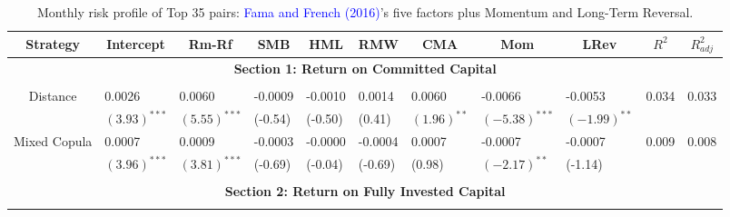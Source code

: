 \documentclass[a4paper]{article}
\begin{document}
		\begin{table}[!ht]
		\centering \scriptsize
		\caption{Monthly risk profile of Top 35 pairs: \textcolor{blue}{Fama and French} \textcolor{blue}{(2016)}'s five factors plus Momentum and Long-Term Reversal.}
		\begin{threeparttable}[H]
			\begin{tabularx}{\textwidth}{@{\extracolsep{\fill}} lllllllllll@{}}
				\toprule
				\multicolumn{1}{c}{Strategy} & \multicolumn{1}{c}{Intercept} &  \multicolumn{1}{c}{Rm-Rf} &  \multicolumn{1}{c}{SMB} &  \multicolumn{1}{c}{HML} &  \multicolumn{1}{c}{RMW} &  \multicolumn{1}{c}{CMA} & 
				\multicolumn{1}{c}{Mom} &  \multicolumn{1}{c}{LRev} &  \multicolumn{1}{c}{$R^{2}$} & \multicolumn{1}{c}{$R^{2}_{adj}$} \\
				\midrule
				\multicolumn{11}{c}{\textbf{Section 1: Return on Committed Capital}} \\
				\multicolumn{1}{c}{} & \multicolumn{1}{c}{} & \multicolumn{1}{c}{} & \multicolumn{1}{c}{} & \multicolumn{1}{c}{} & \multicolumn{1}{c}{} & \multicolumn{1}{c}{} & \multicolumn{1}{c}{} & \multicolumn{1}{c}{} & \multicolumn{1}{c}{} & \\
			\multicolumn{1}{c}{Distance} & 0.0026 & 0.0060 & -0.0009 & -0.0010 & 0.0014 & 0.0060 & -0.0066& -0.0053 & 0.034 & 0.033 \\
			\multicolumn{1}{c}{} & $(3.93)^{***}$ & $(5.55)^{***}$ & (-0.54) & (-0.50) & (0.41) & $(1.96)^{**}$ & $(-5.38)^{***}$ & $(-1.99)^{**}$ & & \vspace{.1cm}\\
			\multicolumn{1}{c}{Mixed Copula} & 0.0007 & 0.0009 & -0.0003 & -0.0000 & -0.0004 & 0.0007 & -0.0007 & -0.0007 & 0.009 & 0.008 \\
			\multicolumn{1}{c}{} & $(3.96)^{***}$ & $(3.81)^{***}$ & (-0.69) & (-0.04) & (-0.69) & (0.98) & $(-2.17)^{**}$ & (-1.14) & & \\
				&       &       &       &       &       &       &       &       &       &       \\
				\midrule
				\multicolumn{11}{c}{\textbf{Section 2: Return on Fully Invested Capital}} \\
				&       &       &       &       &       &       &       &       &       &    \\
		

\end{tabularx}
\end{threeparttable}
\end{table}
\end{document}

